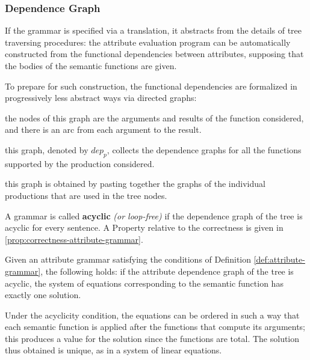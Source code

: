 \documentclass[english]{article}
\begin{document}
\subsubsection{Dependence Graph}

If the grammar is specified via a translation, it abstracts from the details of tree traversing procedures:
the attribute evaluation program can be automatically constructed from the functional dependencies between attributes, supposing that the bodies of the semantic functions are given.

To prepare for such construction, the functional dependencies are formalized in progressively less abstract ways via directed graphs:

\begin{definition}
  the nodes of this graph are the arguments and results of the function considered, and there is an arc from each argument to the result.
\end{definition}
\begin{definition}
  this graph, denoted by \(\textit{dep}_p\), collects the dependence graphs for all the functions supported by the production considered.
\end{definition}
\begin{definition}
  this graph is obtained by pasting together the graphs of the individual productions that are used in the tree nodes.
\end{definition}

\bigskip
A grammar is called \textbf{acyclic} \textit{(or loop-free)} if the dependence graph of the tree is acyclic for every sentence.
A Property relative to the correctness is given in \ref{prop:correctness-attribute-grammar}.

\begin{property}
  \label{prop:correctness-attribute-grammar}
  Given an attribute grammar satisfying the conditions of Definition \ref{def:attribute-grammar}, the following holds:
  if the attribute dependence graph of the tree is acyclic, the system of equations corresponding to the semantic function has exactly one solution.
\end{property}

Under the acyclicity condition, the equations can be ordered in such a way that each semantic function is applied after the functions that compute its arguments;
this produces a value for the solution since the functions are total.
The solution thus obtained is unique, as in a system of linear equations.
\end{document}
